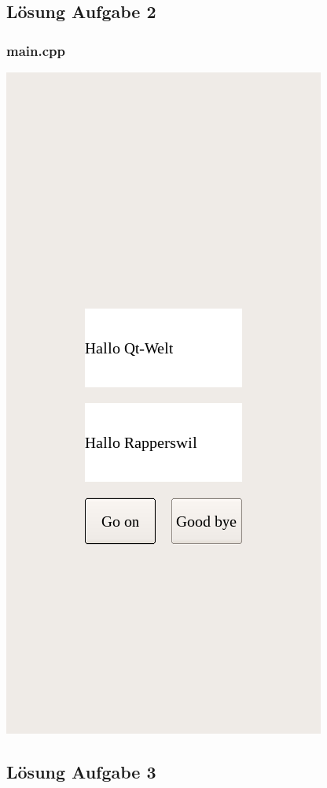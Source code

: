 \subsection{Lösung Aufgabe 2}
\subsubsection{main.cpp}

\begin{center}
	\includegraphics[scale=.5]{./images/u11a2.png}
\end{center}
\subsection{Lösung Aufgabe 3}
